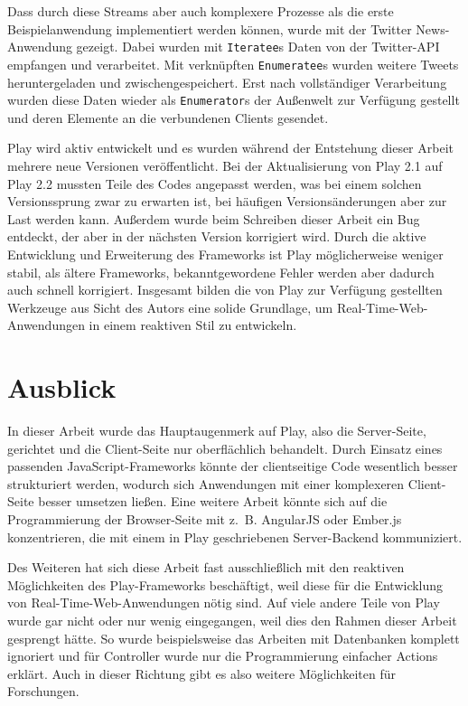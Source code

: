 Dass durch diese Streams aber auch komplexere Prozesse als die erste Beispielanwendung implementiert werden können, wurde mit der Twitter News-Anwendung gezeigt.
Dabei wurden mit \lstinline|Iteratee|s Daten von der Twitter-API empfangen und verarbeitet.
Mit verknüpften \lstinline|Enumeratee|s wurden weitere Tweets heruntergeladen und zwischengespeichert.
Erst nach vollständiger Verarbeitung wurden diese Daten wieder als \lstinline|Enumerator|s der Außenwelt zur Verfügung gestellt und deren Elemente an die verbundenen Clients gesendet.

Play wird aktiv entwickelt und es wurden während der Entstehung dieser Arbeit mehrere neue Versionen veröffentlicht.
Bei der Aktualisierung von Play 2.1 auf Play 2.2 mussten Teile des Codes angepasst werden, was bei einem solchen Versionssprung zwar zu erwarten ist, bei häufigen Versionsänderungen aber zur Last werden kann.
Außerdem wurde beim Schreiben dieser Arbeit ein Bug entdeckt, der aber in der nächsten Version korrigiert wird.
Durch die aktive Entwicklung und Erweiterung des Frameworks ist Play möglicherweise weniger stabil, als ältere Frameworks, bekanntgewordene Fehler werden aber dadurch auch schnell korrigiert.
Insgesamt bilden die von Play zur Verfügung gestellten Werkzeuge aus Sicht des Autors eine solide Grundlage, um Real-Time-Web-Anwendungen in einem reaktiven Stil zu entwickeln.


\section{Ausblick} %
\label{sec:ausblick}

In dieser Arbeit wurde das Hauptaugenmerk auf Play, also die Server-Seite, gerichtet und die Client-Seite nur oberflächlich behandelt.
Durch Einsatz eines passenden JavaScript-Frameworks könnte der clientseitige Code wesentlich besser strukturiert werden, wodurch sich Anwendungen mit einer komplexeren Client-Seite besser umsetzen ließen.
Eine weitere Arbeit könnte sich auf die Programmierung der Browser-Seite mit z.~B. AngularJS \cite[vgl.][]{angular_js} oder \mbox{Ember.js} \cite[vgl.][]{ember_js} konzentrieren, die mit einem in Play geschriebenen Server-Backend kommuniziert. %

Des Weiteren hat sich diese Arbeit fast ausschließlich mit den reaktiven Möglichkeiten des Play-Frameworks beschäftigt, weil diese für die Entwicklung von Real-Time-Web-Anwendungen nötig sind.
Auf viele andere Teile von Play wurde gar nicht oder nur wenig eingegangen, weil dies den Rahmen dieser Arbeit gesprengt hätte.
So wurde beispielsweise das Arbeiten mit Datenbanken komplett ignoriert und für Controller wurde nur die Programmierung einfacher Actions erklärt.
Auch in dieser Richtung gibt es also weitere Möglichkeiten für Forschungen.

